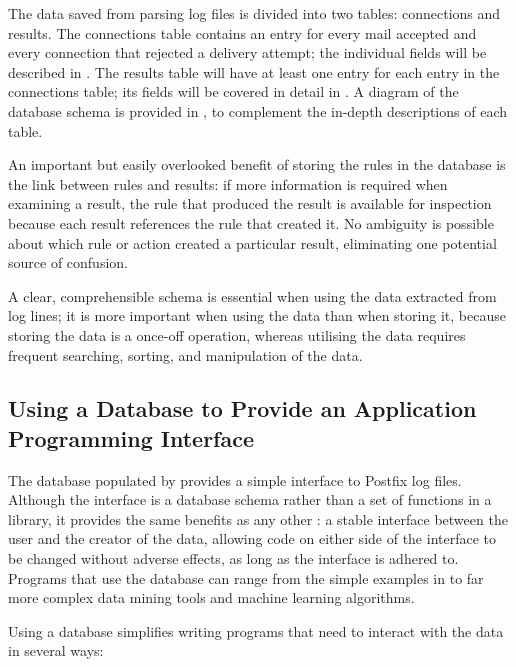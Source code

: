 The data saved from parsing log files is divided into two tables:
connections and results.  The connections table contains an entry for every
mail accepted and every connection that rejected a delivery attempt; the
individual fields will be described in .  The
results table will have at least one entry for each entry in the
connections table; its fields will be covered in detail in
.  A diagram of the database schema is provided
in , to complement the
in-depth descriptions of each table.

An important but easily overlooked benefit of storing the rules in the
database is the link between rules and results: if more information is
required when examining a result, the rule that produced the result is
available for inspection because each result references the rule that
created it.  No ambiguity is possible about which rule or action created a
particular result, eliminating one potential source of confusion.

A clear, comprehensible schema is essential when using the data extracted
from log lines; it is more important when using the data than when storing
it, because storing the data is a once-off operation, whereas utilising
the data requires frequent searching, sorting, and manipulation of the
data.

\subsection{Using a Database to Provide an Application Programming
Interface}

\label{database as API}

The database populated by \parsername{} provides a simple interface to
Postfix log files.  Although the interface is a database schema rather than
a set of functions in a library, it provides the same benefits as any other
: a stable interface between the user and the creator of the
data, allowing code on either side of the interface to be changed without
adverse effects, as long as the interface is adhered to.  Programs that use
the database can range from the simple examples in 
to far more complex data mining tools and machine learning algorithms.

Using a database simplifies writing programs that need to interact with the
data in several ways:

